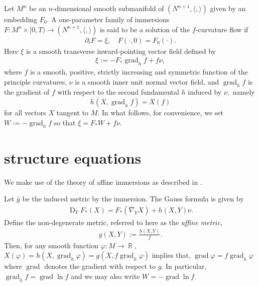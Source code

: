 \documentclass{amsart}
\theoremstyle{definition}
\theoremstyle{remark}
\newcommand{\ip}[2]{\ensuremath{\langle{#1},{#2}\rangle}}
\DeclareMathOperator{\grad}{grad}
\DeclareMathOperator{\D}{D}
\DeclareMathOperator{\RR}{\mathbb{R}}
\numberwithin{equation}{section}
\begin{document}
\title[]
 {}

\curraddr{}
\email{}
\date{\today}

\dedicatory{}
\subjclass[2010]{}
\keywords{}

\begin{abstract}

\end{abstract}

\maketitle
Let $M^n$ be an $n$-dimensional smooth submanifold of $(N^{n+1},\ip{}{})$ given by an embedding $F_0.$ A one-parameter family of immersions $F\colon M^n\times [0,T)\to (N^{n+1},\ip{}{})$ is said to be a solution of the $f$-curvature flow if
\begin{align}
\partial_tF = \xi,\quad F(\cdot, 0) = F_0(\cdot).
\end{align}
Here $\xi $ is a smooth transverse inward-pointing vector field defined by
\begin{align}
\xi := -F_{\ast}\grad_h f + f\nu,
\end{align}
where $f$ is a smooth, positive, strictly increasing and symmetric function of the principle curvatures, $\nu$ is a smooth inner unit normal vector field, and $\grad_h f$ is the gradient of $f$ with respect to the second fundamental $h$ induced by $\nu,$ namely
\[
h(X, \grad_h f) = X(f)
\]
for all vectors $X$ tangent to $M$. In what follows, for convenience, we set $W := -\grad_h f$ so that $\xi = F_{\ast} W + f \nu$.


\section{structure equations}

We make use of the theory of affine immersions as described in \cite{MR1311248}.

Let $\bar{g}$ be the induced metric by the immersion. The Gauss formula is given by
\begin{align}\label{gauss equ}
\D_YF_{\ast}(X)=F_{\ast}(\bar{\nabla}_YX)+h(X,Y)\nu.
\end{align}
Define the non-degenerate metric, referred to here as the \emph{affine metric},
\begin{align}
g(X,Y):=\frac{h(X,Y)}{ f }.
\end{align}
Then, for any smooth function $\varphi : M \to \RR$, $X(\varphi) = h(X, \grad_h \varphi) = g(X, f \grad_h \varphi)$ implies that, $\grad \varphi = f \grad_h \varphi$ where $\grad$ denotes the gradient with respect to $g$. In particular, $\grad_h f = \grad \ln f$ and we may also write $W = -\grad \ln f$.
\end{document}
